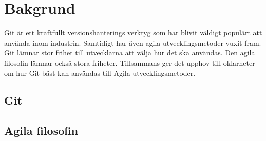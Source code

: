 \section{Bakgrund}
\label{sec:bjorn-background}

Git är ett kraftfullt versionshanterings verktyg som har blivit väldigt populärt att använda inom industrin. Samtidigt har även agila utvecklingsmetoder vuxit fram. Git lämnar stor frihet till utvecklarna att välja hur det ska användas. Den agila filosofin lämnar också stora friheter. Tillsammans ger det upphov till oklarheter om hur Git bäst kan användas till Agila utvecklingsmetoder.

\subsection{Git}

\subsection{Agila filosofin}
